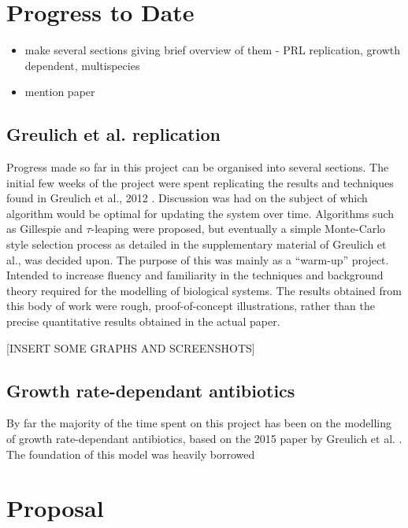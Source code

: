 \documentclass[a4paper,12pt]{article}
\begin{document}
\section{Progress to Date}

\begin{itemize}
 \item make several sections giving brief overview of them - PRL replication, growth dependent, multispecies 
 \item mention paper
\end{itemize}



\subsection{Greulich et al. replication}

Progress made so far in this project can be organised into several sections.  The initial few weeks of the project 
were spent replicating the results and techniques found in Greulich et al., 2012 \cite{bioref:PRL-drugGradients}.  Discussion was had
on the subject of which algorithm would be optimal for updating the system over time.  Algorithms such as Gillespie \cite{bioref:Gillespie-algorithm} 
and $\tau$-leaping \cite{bioref:tau-leap-algorithm} were proposed, but eventually a simple Monte-Carlo style selection process as detailed in the supplementary material 
of Greulich et al., was decided upon.  The purpose of this was mainly as a ``warm-up'' project.  Intended to increase fluency and familiarity in the techniques and background 
theory required for the modelling of biological systems.  The results obtained from this body of work were rough, proof-of-concept illustrations, rather than the precise 
quantitative results obtained in the actual paper.

[INSERT SOME GRAPHS AND SCREENSHOTS]


\subsection{Growth rate-dependant antibiotics}

By far the majority of the time spent on this project has been on the modelling of growth rate-dependant antibiotics, based on the 2015 paper by Greulich et al. 
\cite{bioref:Greulich-growthDependentAntibiotics}.  The foundation of this model was heavily borrowed 



\section{Proposal}
\end{document}
